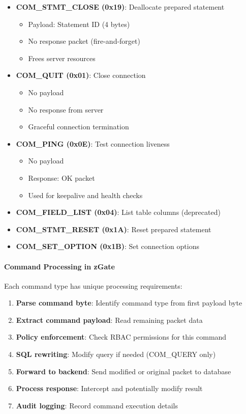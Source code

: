 \begin{itemize}
    \item \textbf{COM\_STMT\_CLOSE (0x19)}: Deallocate prepared statement
    \begin{itemize}
        \item Payload: Statement ID (4 bytes)
        \item No response packet (fire-and-forget)
        \item Frees server resources
    \end{itemize}
    
    \item \textbf{COM\_QUIT (0x01)}: Close connection
    \begin{itemize}
        \item No payload
        \item No response from server
        \item Graceful connection termination
    \end{itemize}
    
    \item \textbf{COM\_PING (0x0E)}: Test connection liveness
    \begin{itemize}
        \item No payload
        \item Response: OK packet
        \item Used for keepalive and health checks
    \end{itemize}
    
    \item \textbf{COM\_FIELD\_LIST (0x04)}: List table columns (deprecated)
    
    \item \textbf{COM\_STMT\_RESET (0x1A)}: Reset prepared statement
    
    \item \textbf{COM\_SET\_OPTION (0x1B)}: Set connection options
\end{itemize}

\paragraph{Command Processing in zGate}

Each command type has unique processing requirements:

\begin{enumerate}
    \item \textbf{Parse command byte}: Identify command type from first payload byte
    \item \textbf{Extract command payload}: Read remaining packet data
    \item \textbf{Policy enforcement}: Check RBAC permissions for this command
    \item \textbf{SQL rewriting}: Modify query if needed (COM\_QUERY only)
    \item \textbf{Forward to backend}: Send modified or original packet to database
    \item \textbf{Process response}: Intercept and potentially modify result
    \item \textbf{Audit logging}: Record command execution details
\end{enumerate}

